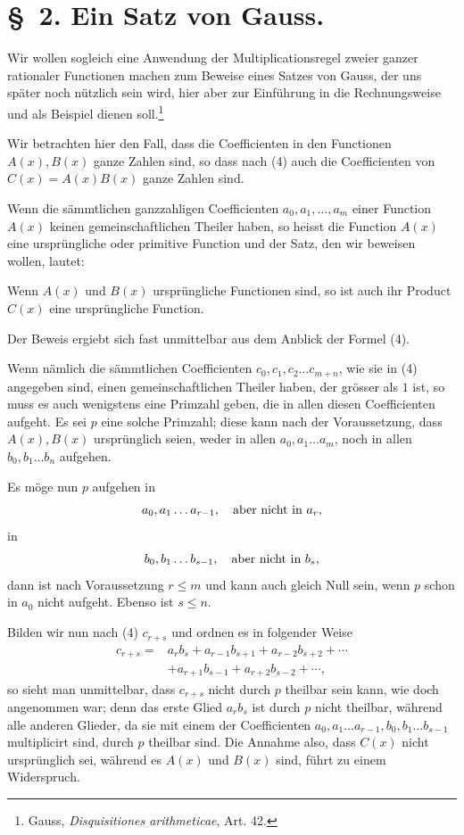 \documentclass[11pt]{article}
\begin{document}
\section*{\S~2. Ein Satz von Gauss.}

Wir wollen sogleich eine Anwendung der Multiplicationsregel zweier ganzer rationaler Functionen machen zum Beweise eines Satzes von Gauss, der uns später noch nützlich sein wird, hier aber zur Einführung in die Rechnungsweise und als Beispiel dienen soll.\footnote{Gauss, \emph{Disquisitiones arithmeticae}, Art. 42.}

Wir betrachten hier den Fall, dass die Coefficienten in den Functionen $A(x),B(x)$ ganze Zahlen sind, so dass nach (4) auch die Coefficienten von $C(x)=A(x)B(x)$ ganze Zahlen sind.

Wenn die sämmtlichen ganzzahligen Coefficienten $a_0,a_1,\ldots,a_m$ einer Function $A(x)$ keinen gemeinschaftlichen Theiler haben, so heisst die Function $A(x)$ eine ursprüngliche oder primitive Function und der Satz, den wir beweisen wollen, lautet:

Wenn $A(x)$ und $B(x)$ ursprüngliche Functionen sind, so ist auch ihr Product $C(x)$ eine ursprüngliche Function.

Der Beweis ergiebt sich fast unmittelbar aus dem Anblick der Formel (4).

Wenn nämlich die sämmtlichen Coefficienten $c_0,c_1,c_2\ldots c_{m+n}$, wie sie in (4) angegeben sind, einen gemeinschaftlichen Theiler haben, der grösser als $1$ ist, so muss es auch wenigstens eine Primzahl geben, die in allen diesen Coefficienten aufgeht. Es sei $p$ eine solche Primzahl; diese kann nach der Voraussetzung, dass $A(x),B(x)$ ursprünglich seien, weder in allen $a_0,a_1\ldots a_m$, noch in allen $b_0,b_1\ldots b_n$ aufgehen.

Es möge nun $p$ aufgehen in
\[
 a_0,a_1\ldots a_{r-1},\quad \hbox{aber nicht in }a_r,
\]
in
\[
 b_0,b_1\ldots b_{s-1},\quad \hbox{aber nicht in }b_s,
\]
dann ist nach Voraussetzung $r\le m$ und kann auch gleich Null sein, wenn $p$ schon in $a_0$ nicht aufgeht. Ebenso ist $s\le n$.

Bilden wir nun nach (4) $c_{r+s}$ und ordnen es in folgender Weise
\begin{equation}
\begin{aligned}
 c_{r+s}={}&a_rb_s+a_{r-1}b_{s+1}+a_{r-2}b_{s+2}+\cdots\\
&+a_{r+1}b_{s-1}+a_{r+2}b_{s-2}+\cdots,
\end{aligned}
\tag{1}
\end{equation}
so sieht man unmittelbar, dass $c_{r+s}$ nicht durch $p$ theilbar sein kann, wie doch angenommen war; denn das erste Glied $a_rb_s$ ist durch $p$ nicht theilbar, während alle anderen Glieder, da sie mit einem der Coefficienten $a_0,a_1\ldots a_{r-1},b_0,b_1\ldots b_{s-1}$ multiplicirt sind, durch $p$ theilbar sind. Die Annahme also, dass $C(x)$ nicht ursprünglich sei, während es $A(x)$ und $B(x)$ sind, führt zu einem Widerspruch.
\end{document}
